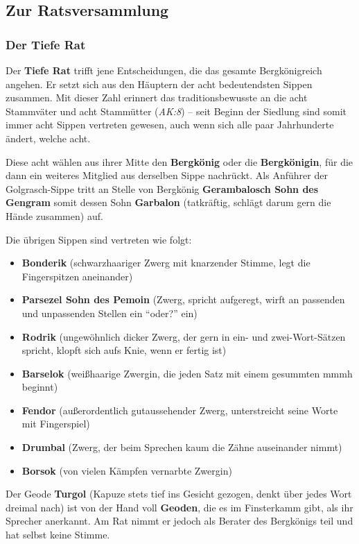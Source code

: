 \vfill

\subsection{Zur Ratsversammlung}
\subsubsection{Der Tiefe Rat}
Der \textbf{Tiefe Rat} trifft jene Entscheidungen, die das  gesamte Bergkönigreich angehen.
Er setzt sich aus den Häuptern der acht bedeutendsten Sippen zusammen.
Mit dieser Zahl erinnert das traditionsbewusste \fkv an die acht Stammväter und acht Stammütter (\emph{AK:8}) --
seit Beginn der Siedlung sind somit immer acht Sippen vertreten gewesen, auch wenn sich alle paar Jahrhunderte ändert, welche acht.


Diese acht wählen aus ihrer Mitte den \textbf{Bergkönig} oder die \textbf{Bergkönigin}, für die dann ein weiteres Mitglied aus derselben Sippe nachrückt.
Als Anführer der Golgrasch-Sippe tritt an Stelle von Bergkönig \textbf{Gerambalosch Sohn des Gengram} somit dessen Sohn
\textbf{Garbalon} (tatkräftig, schlägt darum gern die Hände zusammen) auf.

\neuespalte

Die übrigen Sippen sind vertreten wie folgt:
\begin{itemize}
\item \textbf{Bonderik} (schwarzhaariger Zwerg mit knarzender Stimme, legt die Fingerspitzen aneinander)
\item \textbf{Parsezel Sohn des Pemoin} (Zwerg, spricht aufgeregt, wirft an passenden und unpassenden Stellen ein \enquote{oder?} ein)
\item \textbf{Rodrik} (ungewöhnlich dicker Zwerg, der gern in ein- und zwei-Wort-Sätzen spricht, klopft sich aufs Knie, wenn er fertig ist)
\item \textbf{Barselok} (weißhaarige Zwergin, die jeden Satz mit einem gesummten mmmh beginnt)
\item \textbf{Fendor} (außerordentlich gutaussehender Zwerg, unterstreicht seine Worte mit Fingerspiel)
\item \textbf{Drumbal} (Zwerg, der beim Sprechen kaum die Zähne auseinander nimmt)
\item \textbf{Borsok}  (von vielen Kämpfen vernarbte Zwergin)
\end{itemize}

Der Geode \textbf{Turgol} (Kapuze stets tief ins Gesicht gezogen, denkt über jedes Wort dreimal nach) ist von der Hand voll \textbf{Geoden}, die es im Finsterkamm gibt, als ihr Sprecher anerkannt.
Am Rat nimmt er jedoch als Berater des Bergkönigs teil und hat selbst keine Stimme.

